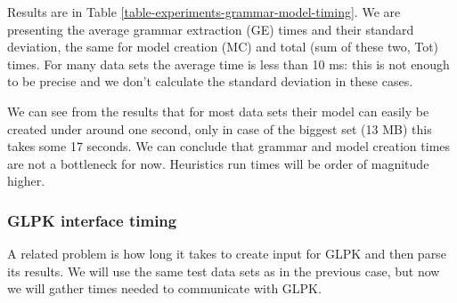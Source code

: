 Results are in Table \ref{table-experiments-grammar-model-timing}. We are presenting the average grammar extraction (GE) times and their standard deviation, the same for model creation (MC) and total (sum of these two, Tot) times. For many data sets the average time is less than 10 ms: this is not enough to be precise and we don't calculate the standard deviation in these cases.

We can see from the results that for most data sets their model can easily be created under around one second, only in case of the biggest set  (13 MB) this takes some 17 seconds. We can conclude that grammar and model creation times are not a bottleneck for now. Heuristics run times will be order of magnitude higher.

\subsubsection{GLPK interface timing}


A related problem is how long it takes to create input for GLPK and then parse its results. We will use the same test data sets as in the previous case, but now we will gather times needed to communicate with GLPK.

